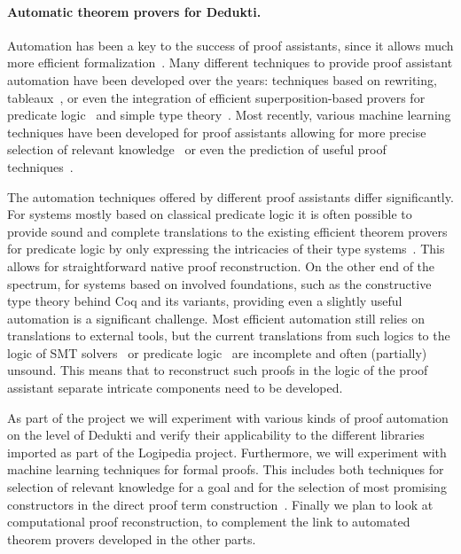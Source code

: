 \paragraph*{Automatic theorem provers for Dedukti.}
Automation has been a key to the success of proof assistants, since it
allows much more efficient formalization~\cite{Hales-Developments}.
Many different techniques to provide proof assistant automation have
been developed over the years: techniques based on rewriting,
tableaux~\cite{Paulson-blast}, or even the integration of efficient
superposition-based provers for predicate logic~\cite{hurd-metis} and
simple type theory~\cite{asperti-matita-paramodulation}. Most
recently, various machine learning techniques have been developed for
proof assistants allowing for more precise selection of relevant
knowledge~\cite{blanchette-h4qed-jfr} or even the prediction of useful
proof techniques~\cite{gauthier-tactictoe}.

The automation techniques offered by different proof assistants differ
significantly. For systems mostly based on classical predicate logic
it is often possible to provide sound and complete translations to the
existing efficient theorem provers for predicate logic by only
expressing the intricacies of their type
systems~\cite{kaliszyk-miz40}. This allows for straightforward native
proof reconstruction. On the other end of the spectrum, for
systems based on involved foundations, such
as the constructive type theory behind Coq and its variants,
providing even a slightly useful automation is a significant
challenge. Most efficient automation still relies on translations to
external tools, but the current translations from such logics to
the logic of SMT solvers~\cite{DBLP:conf/cpp/ArmandFGKTW11} or
predicate logic~\cite{DBLP:journals/jar/CzajkaK18} are incomplete
and often (partially) unsound. This means that to reconstruct such
proofs in the logic of the proof assistant separate intricate
components need to be developed.

As part of the project we will experiment with various kinds of proof
automation on the level of Dedukti and verify their applicability to
the different libraries imported as part of the Logipedia project.
Furthermore, we will experiment with machine learning techniques for
formal proofs. This includes both techniques for selection of relevant
knowledge for a goal and for the selection of most promising
constructors in the direct proof term
construction~\cite{ZielenkiewiczSchubert2016}. Finally we plan to look
at computational proof reconstruction, to complement the link to
automated theorem provers developed in the other parts.


